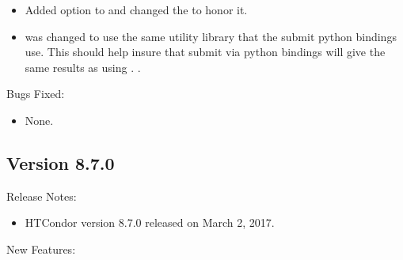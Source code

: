 \begin{itemize}
\item Added  option to  and changed the  to honor it.

\item {} was changed to use the same utility library that the submit python bindings use.
This should help insure that submit via python bindings will give the same results as using .
.

\end{itemize}

\noindent Bugs Fixed:

\begin{itemize}

\item None.

\end{itemize}

\subsection*{\label{sec:New-8-7-0}Version 8.7.0}

\noindent Release Notes:

\begin{itemize}

\item HTCondor version 8.7.0 released on March 2, 2017.

\end{itemize}


\noindent New Features:

